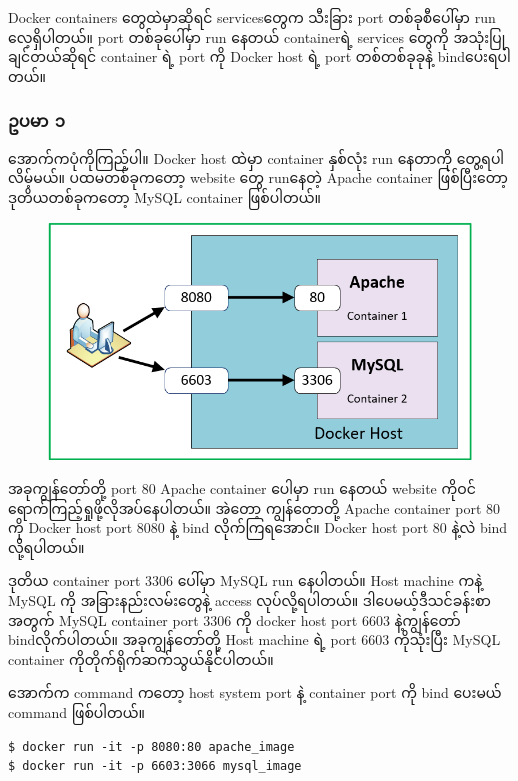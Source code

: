 \documentclass{article}
\begin{document}
Docker containers တွေထဲမှာဆိုရင် servicesတွေက သီးခြား port
တစ်ခုစီပေါ်မှာ run လေ့ရှိပါတယ်။ port တစ်ခုပေါ်မှာ run နေတယ် containerရဲ့
services ‌တွေကို အသုံးပြုချင်တယ်ဆိုရင် container ရဲ့ port ကို Docker
host ရဲ့ port တစ်တစ်ခုခုနဲ့ bindပေးရပါတယ်။

\subsubsection{ဥပမာ ၁}\label{ux1025ux1015ux1019}

အောက်‌ကပုံကိုကြည့်ပါ။ Docker host ထဲမှာ container နှစ်လုံး run နေတာကို
တွေ့ရပါလိမ့်မယ်။ ပထမတစ်ခုကတော့ website တွေ runနေတဲ့ Apache container
ဖြစ်ပြီးတော့ ဒုတိယတစ်ခုကတော့ MySQL container ဖြစ်ပါတယ်။

\begin{figure}[htbp]
\centering
\includegraphics[width=0.70\paperwidth]{.gitbook/assets/screenshot-132.png}
\end{figure}

အခုကျွန်တော်တို့ port 80 Apache container ပေါမှာ run နေတယ် website
ကိုဝင်ရောက်ကြည့်ရှုဖို့လိုအပ်နေပါတယ်။ အဲတော့ ကျွန်တောတို့ Apache
container port 80 ကို Docker host port 8080 နဲ့ bind လိုက်ကြရအောင်။
Docker host port 80 နဲ့လဲ bind လို့ရပါတယ်။

ဒုတိယ container port 3306 ပေါ်မှာ MySQL run နေပါတယ်။ Host machine ကနဲ့
MySQL ကို အခြားနည်းလမ်းတွေနဲ့ access လုပ်လို့ရပါတယ်။
ဒါပေမယ့်ဒီသင်ခန်းစာအတွက် MySQL container port 3306 ကို docker host port
6603 နဲ့ကျွန်တော် bindလိုက်ပါတယ်။ အခုကျွန်တော်တို့ Host machine ရဲ့ port
6603 ကိုသုံးပြီး MySQL container ကိုတိုက်ရိုက်ဆက်သွယ်နိုင်ပါတယ်။

အောက်က command ကတော့ host system port နဲ့ container port ကို bind ပေးမယ်
command ဖြစ်ပါတယ်။

\begin{verbatim}
$ docker run -it -p 8080:80 apache_image
$ docker run -it -p 6603:3066 mysql_image
\end{verbatim}
\end{document}
